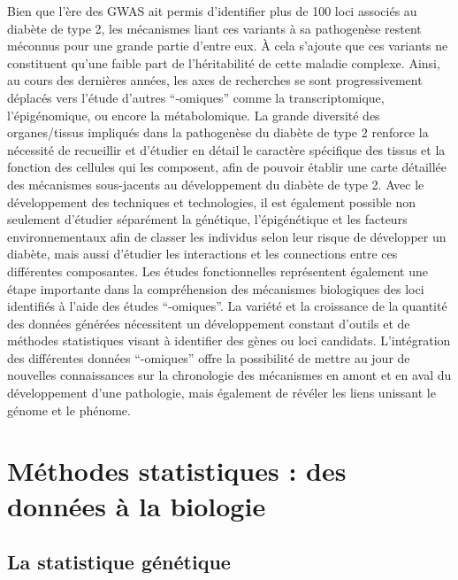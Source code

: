 \documentclass[11pt,a4paper,notrimn]{krantz}
\theoremstyle{definition}
\theoremstyle{definition}
\theoremstyle{remark}
\begin{document}
Bien que l'ère des GWAS ait permis d'identifier plus de 100 loci
associés au diabète de type 2, les mécanismes liant ces variants à sa
pathogenèse restent méconnus pour une grande partie d'entre eux. À cela
s'ajoute que ces variants ne constituent qu'une faible part de
l'héritabilité de cette maladie complexe. Ainsi, au cours des dernières
années, les axes de recherches se sont progressivement déplacés vers
l'étude d'autres ``-omiques'' comme la transcriptomique, l'épigénomique,
ou encore la métabolomique. La grande diversité des organes/tissus
impliqués dans la pathogenèse du diabète de type 2 renforce la nécessité
de recueillir et d'étudier en détail le caractère spécifique des tissus
et la fonction des cellules qui les composent, afin de pouvoir établir
une carte détaillée des mécanismes sous-jacents au développement du
diabète de type 2. Avec le développement des techniques et technologies,
il est également possible non seulement d'étudier séparément la
génétique, l'épigénétique et les facteurs environnementaux afin de
classer les individus selon leur risque de développer un diabète, mais
aussi d'étudier les interactions et les connections entre ces
différentes composantes. Les études fonctionnelles représentent
également une étape importante dans la compréhension des mécanismes
biologiques des loci identifiés à l'aide des études ``-omiques''. La
variété et la croissance de la quantité des données générées nécessitent
un développement constant d'outils et de méthodes statistiques visant à
identifier des gènes ou loci candidats. L'intégration des différentes
données ``-omiques'' offre la possibilité de mettre au jour de nouvelles
connaissances sur la chronologie des mécanismes en amont et en aval du
développement d'une pathologie, mais également de révéler les liens
unissant le génome et le phénome.

\section{Méthodes statistiques : des données à la
biologie}\label{methodes-statistiques-des-donnees-a-la-biologie}

\subsection{La statistique génétique}\label{la-statistique-genetique}
\end{document}
